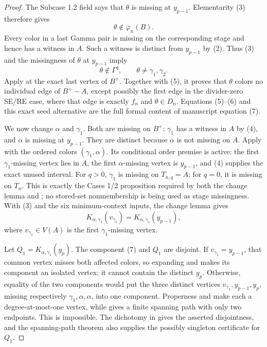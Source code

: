 \begin{proof}
The Subcase 1.2 field says that \(\theta\) is missing at
\(y_{p-1}\).  Elementarity (3) therefore gives
\[
                  \theta\notin\overline\varphi_n(B).         \tag{5}
\]
Every color in a last Gamma pair is missing on the corresponding stage
and hence has a witness in \(A\).  Such a witness is distinct from
\(y_{p-1}\) by (2).  Thus (3) and the missingness of \(\theta\) at
\(y_{p-1}\) imply
\[
 \theta\notin\Gamma^q,\qquad
 \theta\ne\gamma_1,\gamma_2.                                \tag{6}
\]
Apply  at the exact last
vertex of \(B^+\).  Together with (5), it proves that \(\theta\) colors
no individual edge of \(B^+-A\), except possibly the first edge in the
divider-zero SE/RE case, where that edge is exactly \(f_n\) and
\(\theta\in D_n\).  Equations (5)--(6) and this exact seed alternative
are the full formal content of manuscript equation (7).

We now change \(\alpha\) and \(\gamma_1\).  Both are missing on
\(B^+\): \(\gamma_1\) has a witness in \(A\) by (4), and \(\alpha\)
is missing at \(y_{p-1}\).  They are distinct because \(\alpha\) is not
missing on \(A\).  Apply  with the ordered colors
\((\gamma_1,\alpha)\).  Its conditional order premise is active:
the first \(\gamma_1\)-missing vertex lies in \(A\), the first
\(\alpha\)-missing vertex is \(y_{p-1}\), and (4) supplies the exact
unused interval.  For \(q>0\), \(\gamma_1\) is missing on
\(T_{n,q}=A\); for \(q=0\), it is missing on \(T_n\).  This is exactly
the Cases 1/2 proposition required by both the change lemma and
; no stored-set nonmembership is being
used as stage missingness.  With (3) and the six minimum-context inputs,
the change lemma gives
\[
 K_{\alpha,\gamma_1}(v_{\gamma_1})
       =K_{\alpha,\gamma_1}(y_{p-1}),                         \tag{7}
\]
where \(v_{\gamma_1}\in V(A)\) is the first
\(\gamma_1\)-missing vertex.

Let \(Q_1=K_{\alpha,\gamma_1}(y_p)\).  The component (7) and \(Q_1\)
are disjoint.  If \(v_{\gamma_1}=y_{p-1}\), that common vertex misses
both affected colors, so expanding  and
 makes its component an isolated vertex;
it cannot contain the distinct \(y_p\).  Otherwise, equality of the two
components would put the three distinct vertices
\(v_{\gamma_1},y_{p-1},y_p\), missing respectively
\(\gamma_1,\alpha,\alpha\), into one component.  Properness and
 make each a degree-at-most-one
vertex, while  gives a finite
spanning path with only two endpoints.  This is impossible.  The
dichotomy in  gives the asserted
disjointness, and the spanning-path theorem also supplies the possibly
singleton  certificate for \(Q_1\).


\end{proof}
